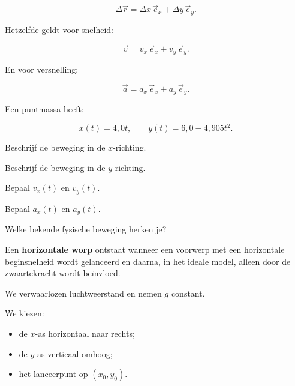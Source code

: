 \documentclass{ximera}
\begin{document}
\[
\Delta\vec r
=
\Delta x\,\vec e_x+\Delta y\,\vec e_y.
\]

Hetzelfde geldt voor snelheid:

\[
\vec v
=
v_x\,\vec e_x+v_y\,\vec e_y.
\]

En voor versnelling:

\[
\vec a
=
a_x\,\vec e_x+a_y\,\vec e_y.
\]


\begin{oefening}{\oefU\ESS}

Een puntmassa heeft:

\[
x(t)=4,0t,
\qquad
y(t)=6,0-4,905t^2.
\]

\begin{question}
Beschrijf de beweging in de $x$-richting.
\end{question}

\begin{question}
Beschrijf de beweging in de $y$-richting.
\end{question}

\begin{question}
Bepaal $v_x(t)$ en $v_y(t)$.
\end{question}

\begin{question}
Bepaal $a_x(t)$ en $a_y(t)$.
\end{question}

\begin{question}
Welke bekende fysische beweging herken je?
\end{question}

\end{oefening}




Een \textbf{horizontale worp} ontstaat wanneer een voorwerp met een
horizontale beginsnelheid wordt gelanceerd en daarna, in het ideale
model, alleen door de zwaartekracht wordt beïnvloed.

We verwaarlozen luchtweerstand en nemen $g$ constant.

We kiezen:

\begin{itemize}
  \item de $x$-as horizontaal naar rechts;
  \item de $y$-as verticaal omhoog;
  \item het lanceerpunt op $(x_0,y_0)$.
\end{itemize}
\end{document}
